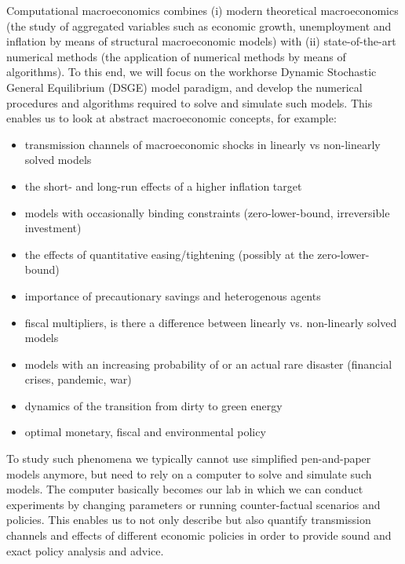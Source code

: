 Computational macroeconomics combines (i) modern theoretical macroeconomics 
  (the study of aggregated variables such as economic growth, unemployment and inflation 
  by means of structural macroeconomic models)
  with (ii) state-of-the-art numerical methods (the application of numerical methods by means of algorithms).
To this end, we will focus on the workhorse Dynamic Stochastic General Equilibrium (DSGE) model paradigm,
  and develop the numerical procedures and algorithms required to solve and simulate such models.
This enables us to look at abstract macroeconomic concepts, for example:
\begin{itemize}
	\item transmission channels of macroeconomic shocks in linearly vs non-linearly solved models
	\item the short- and long-run effects of a higher inflation target
	\item models with occasionally binding constraints (zero-lower-bound, irreversible investment)
	\item the effects of quantitative easing/tightening (possibly at the zero-lower-bound)
	\item importance of precautionary savings and heterogenous agents
	\item fiscal multipliers, is there a difference between linearly vs. non-linearly solved models
	\item models with an increasing probability of or an actual rare disaster (financial crises, pandemic, war)
	\item dynamics of the transition from dirty to green energy
	\item optimal monetary, fiscal and environmental policy
\end{itemize}
	
To study such phenomena we typically cannot use simplified pen-and-paper models anymore,
  but need to rely on a computer to solve and simulate such models.
The computer basically becomes our lab in which we can conduct experiments
  by changing parameters or running counter-factual scenarios and policies.
This enables us to not only describe but also quantify transmission channels and effects of different economic policies
  in order to provide sound and exact policy analysis and advice.


